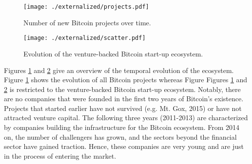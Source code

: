 \begin{figure}
\centering
\texttt{[image: ./externalized/projects.pdf]}
\caption{Number of new Bitcoin projects over time.}
\label{fig:eco:projects}
\end{figure}

\begin{figure}
\centering
\texttt{[image: ./externalized/scatter.pdf]}
\caption{Evolution of the venture-backed Bitcoin start-up ecosystem.}
\label{fig:eco:evolution}
\end{figure}

Figures \ref{fig:eco:projects} and \ref{fig:eco:evolution} give an overview of the temporal evolution of the ecosystem. Figure 
\ref{fig:eco:projects} shows the evolution of all Bitcoin projects whereas Figure 
Figures \ref{fig:eco:projects} and \ref{fig:eco:evolution} is restricted to 
the venture-backed Bitcoin start-up ecosystem. Notably, there are no companies 
that were founded in the first two years of Bitcoin's existence. Projects that 
started earlier have not survived (e.g. Mt. Gox, 2015) or have not attracted venture 
capital. The following three years (2011-2013) are characterized by companies building 
the infrastructure for the Bitcoin ecosystem. From 2014 on, the number of challengers 
has grown, and the sectors beyond the financial sector have gained traction. Hence, 
these companies are very young and are just in the process of entering the market.

